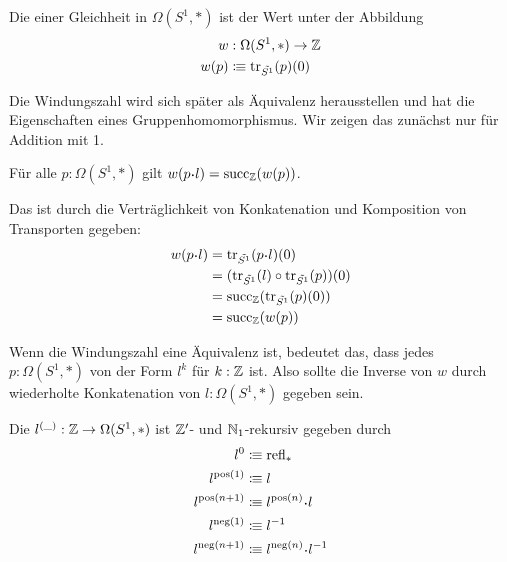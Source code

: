 \begin{definition}
  Die  einer Gleichheit in $\Omega(S^1,\ast)$ ist der Wert unter der Abbildung
  \begin{align*}
    w&:\Omega(S^1,\ast)\to \mathbb{Z} \\
    w(p)&\vcentcolon\mspace{-1.2mu}\equiv \mathrm{tr}_{\tilde{S^1}}(p)(0)
  \end{align*}
\end{definition}

Die Windungszahl wird sich später als Äquivalenz herausstellen und hat die Eigenschaften eines Gruppenhomomorphismus.
Wir zeigen das zunächst nur für Addition mit 1.

\begin{bemerkung}
  \label{bem:hom-windungszahl}
  Für alle $p:\Omega(S^1,\ast)$ gilt $w(p\kon l)=\mathrm{succ}_{\Z}(w(p))$.
\end{bemerkung}
\begin{beweis}
  Das ist durch die Verträglichkeit von Konkatenation und Komposition von Transporten gegeben:
  \begin{align*}
    w(p\kon l)&=\transp_{\tilde{S^1}}(p\kon l)(0) \\
              &=(\transp_{\tilde{S^1}}(l)\circ\transp_{\tilde{S^1}}(p))(0) \\
              &=\mathrm{succ}_\Z(\transp_{\tilde{S^1}}(p)(0)) \\
    &=\mathrm{succ}_\Z(w(p)) 
  \end{align*}
\end{beweis}

Wenn die Windungszahl eine Äquivalenz ist, bedeutet das, dass jedes $p:\Omega(S^1,\ast)$ von der Form $l^k$ für $k:\mathbb{Z}$ ist.
Also sollte die Inverse von $w$ durch wiederholte Konkatenation von $l:\Omega(S^1,\ast)$ gegeben sein.

\begin{definition}
  Die  $l^{(\_)}:\mathbb{Z}\to\Omega(S^1,\ast)$ ist $\mathbb{Z}'$- und $\mathbb{N}_1$-rekursiv gegeben durch
  \begin{align*}
    l^0&\colonequiv \refl_\ast \\
    l^{\mathrm{pos}(1)}&\colonequiv l \\
    l^{\mathrm{pos}(n+1)}&\colonequiv l^{\mathrm{pos}(n)}\kon l \\
    l^{\mathrm{neg}(1)}&\colonequiv l^{-1} \\
    l^{\mathrm{neg}(n+1)}&\colonequiv l^{\mathrm{neg}(n)}\kon l^{-1}
  \end{align*}
\end{definition}

